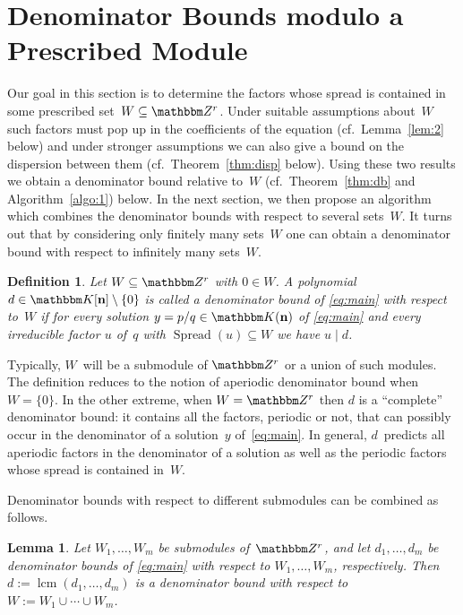 \documentclass[a4paper]{sig-alternate}
\let\set\mathbbm
\def\vec#1{\mathbf{#1}}
\def\spread{\operatorname{Spread}}
\def\lcm{\operatorname{lcm}}
\def\K{\set K}
\newtheorem{lemma}{Lemma}
\newtheorem{definition}{Definition}
\begin{document}
\section{Denominator Bounds modulo a Prescribed Module}

Our goal in this section is to determine the factors whose spread is contained
in some prescribed set~$W\subseteq\set Z^r$. Under suitable assumptions
about~$W$ such factors must pop up in the coefficients of the equation (cf.\
Lemma~\ref{lem:2} below) and under stronger assumptions we can also give a bound
on the dispersion between them (cf.\ Theorem~\ref{thm:disp} below). Using these
two results we obtain a denominator bound relative to~$W$ (cf.\
Theorem~\ref{thm:db} and Algorithm~\ref{algo:1}) below. In the next section, we
then propose an algorithm which combines the denominator bounds with respect to
several sets~$W$. It turns out that by considering only finitely many sets~$W$ 
one can obtain a denominator bound with respect to infinitely many sets~$W$.

\begin{definition}
  Let $W\subseteq\set Z^r$ with $0\in W$.
  A polynomial $d\in\K[\vec n]\setminus\{0\}$ is called a denominator bound of \eqref{eq:main}
  with respect to~$W$ if for every solution $y=p/q\in\K(\vec n)$
  of \eqref{eq:main} and every irreducible factor $u$ of~$q$ with
  $\spread(u)\subseteq W$ we have $u\mid d$.
\end{definition}

Typically, $W$~will be a submodule of $\set Z^r$ or a union of such modules.
The definition reduces to the notion of aperiodic denominator bound
when $W=\{0\}$. In the other extreme, when $W=\set Z^r$ then $d$ is
a ``complete'' denominator bound: it contains all the factors, periodic or not,
that can possibly occur in the denominator of a solution~$y$ of~\eqref{eq:main}.
In general, $d$~predicts all aperiodic factors in the denominator of a solution
as well as the periodic factors whose spread is contained in~$W$.

Denominator bounds with respect to different submodules can be combined as follows.

\begin{lemma}\label{lemma:lcm}
  Let $W_1,\dots,W_m$ be submodules of~$\set Z^r$, and let
  $d_1,\dots,d_m$ be denominator bounds of \eqref{eq:main} with respect to
  $W_1,\dots,W_m$, respectively. Then
  $d:=\lcm(d_1,\dots,d_m)$ is a denominator bound with respect to
  $W:=W_1\cup\cdots\cup W_m$.
\end{lemma}
\end{document}
